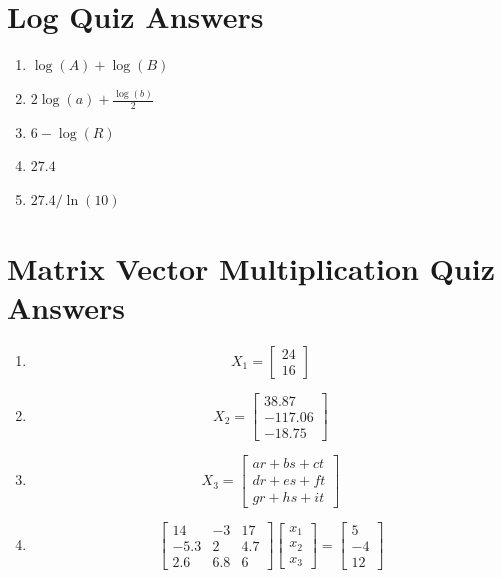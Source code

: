 
\section{Log Quiz Answers}\label{Log_answers}


\begin{enumerate}

\item $\log(A) + \log(B)$

\item $2\log(a)+\frac{\log(b)}{2}$

\item $6-\log(R)$

\item $27.4$

\item $27.4/\ln(10)$

\end{enumerate}



\section{Matrix Vector Multiplication Quiz Answers}\label{Matrix_answers}


\begin{enumerate}

  \item
  \[
  X_1 = \begin{bmatrix}24\\16 \end{bmatrix}
  \]

  \item
  \[
  X_2 = \begin{bmatrix}38.87 \\-117.06\\-18.75 \end{bmatrix}
  \]

  \item
  \[
  X_3 = \begin{bmatrix}ar+bs+ct \\dr+es+ft\\gr+hs+it \end{bmatrix}
  \]

  \item
  \[
    \begin{bmatrix}14&-3&17\\-5.3&2&4.7\\2.6&6.8&6 \end{bmatrix}
    \begin{bmatrix}x_1\\x_2\\x_3\end{bmatrix} =
    \begin{bmatrix}5\\-4\\12\end{bmatrix}
  \]
\end{enumerate}



